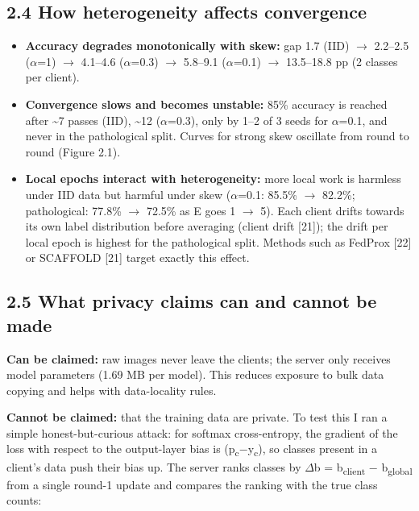 \documentclass[10pt,a4paper]{article}
\begin{document}
\subsection*{2.4 How heterogeneity affects convergence}
\begin{itemize}
\item \textbf{Accuracy degrades monotonically with skew:} gap 1.7 (IID) $\rightarrow$ 2.2--2.5 ($\alpha$=1) $\rightarrow$ 4.1--4.6 ($\alpha$=0.3) $\rightarrow$ 5.8--9.1 ($\alpha$=0.1) $\rightarrow$ 13.5--18.8 pp (2 classes per client).
\item \textbf{Convergence slows and becomes unstable:} 85\% accuracy is reached after \textasciitilde{}7 passes (IID), \textasciitilde{}12 ($\alpha$=0.3), only by 1--2 of 3 seeds for $\alpha$=0.1, and never in the pathological split. Curves for strong skew oscillate from round to round (Figure 2.1).
\item \textbf{Local epochs interact with heterogeneity:} more local work is harmless under IID data but harmful under skew ($\alpha$=0.1: 85.5\% $\rightarrow$ 82.2\%; pathological: 77.8\% $\rightarrow$ 72.5\% as E goes 1 $\rightarrow$ 5). Each client drifts towards its own label distribution before averaging (client drift [21]); the drift per local epoch is highest for the pathological split. Methods such as FedProx [22] or SCAFFOLD [21] target exactly this effect.
\end{itemize}
\subsection*{2.5 What privacy claims can and cannot be made}
\textbf{Can be claimed:} raw images never leave the clients; the server only receives model parameters (1.69 MB per model). This reduces exposure to bulk data copying and helps with data-locality rules.

\textbf{Cannot be claimed:} that the training data are private. To test this I ran a simple honest-but-curious attack: for softmax cross-entropy, the gradient of the loss with respect to the output-layer bias is (p\textsubscript{c}$-$y\textsubscript{c}), so classes present in a client's data push their bias up. The server ranks classes by $\Delta$b = b\textsubscript{client} $-$ b\textsubscript{global} from a single round-1 update and compares the ranking with the true class counts:
\end{document}
